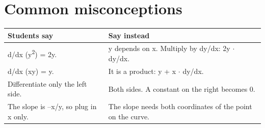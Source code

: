 \documentclass[11pt]{article}
\begin{document}
\section*{Common misconceptions}\begin{tabularx}{\textwidth}{@{}X X@{}}\toprule Students say & Say instead\\\midrule
d/dx (y\textsuperscript{2}) = 2y. & y depends on x. Multiply by dy/dx: 2y $\cdot$ dy/dx.\\
d/dx (xy) = y. & It is a product: y + x $\cdot$ dy/dx.\\
Differentiate only the left side. & Both sides. A constant on the right becomes 0.\\
The slope is --x/y, so plug in x only. & The slope needs both coordinates of the point on the curve.\\
\bottomrule\end{tabularx}
\end{document}
